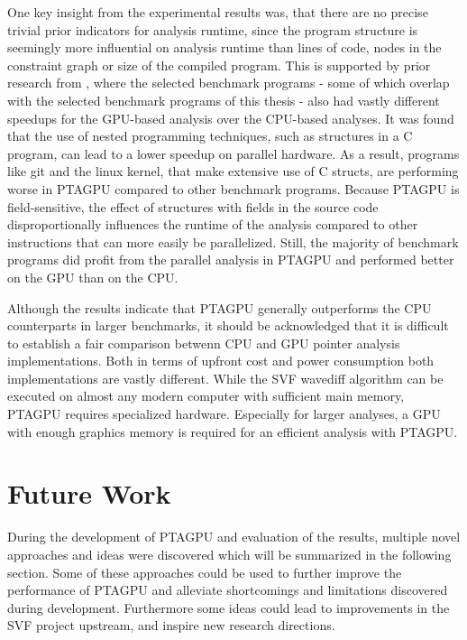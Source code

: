 One key insight from the experimental results was, that there are no precise trivial prior indicators for analysis runtime, since the program structure is seemingly more influential on analysis runtime than lines of code, nodes in the constraint graph or size of the compiled program.
This is supported by prior research from \cite{mendez2012gpu}, where the selected benchmark programs - some of which overlap with the selected benchmark programs of this thesis - also had vastly different speedups for the GPU-based analysis over the CPU-based analyses.
It was found that the use of nested programming techniques, such as structures in a C program, can lead to a lower speedup on parallel hardware.
As a result, programs like git and the linux kernel, that make extensive use of C structs, are performing worse in PTAGPU compared to other benchmark programs.
Because PTAGPU is field-sensitive, the effect of structures with fields in the source code disproportionally influences the runtime of the analysis compared to other instructions that can more easily be parallelized.
Still, the majority of benchmark programs did profit from the parallel analysis in PTAGPU and performed better on the GPU than on the CPU.

Although the results indicate that PTAGPU generally outperforms the CPU counterparts in larger benchmarks, it should be acknowledged that it is difficult to establish a fair comparison betwenn CPU and GPU pointer analysis implementations.
Both in terms of upfront cost and power consumption both implementations are vastly different. While the SVF wavediff algorithm can be executed on almost any modern computer with sufficient main memory, PTAGPU requires specialized hardware. Especially for larger analyses, a GPU with enough graphics memory is required for an efficient analysis with PTAGPU.

\section{Future Work}
During the development of PTAGPU and evaluation of the results, multiple novel approaches and ideas were discovered which will be summarized in the following section.
Some of these approaches could be used to further improve the performance of PTAGPU and alleviate shortcomings and limitations discovered during development.
Furthermore some ideas could lead to improvements in the SVF project upstream, and inspire new research directions.

